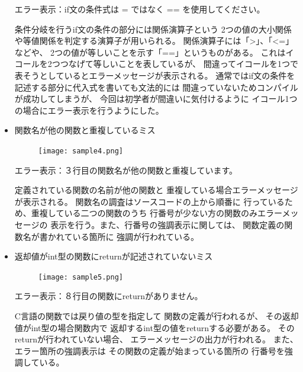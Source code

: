\documentclass{csspaper}
\begin{document}
\begin{itemize}
         エラー表示：if文の条件式は = ではなく == を使用してください。

         条件分岐を行うif文の条件の部分には関係演算子という
         2つの値の大小関係や等値関係を判定する演算子が用いられる。
         関係演算子には「\textgreater」、「\textless=」などや、
         2つの値が等しいことを示す「==」というものがある。
         これはイコールを2つつなげて等しいことを表しているが、
         間違ってイコールを1つで表そうとしているとエラーメッセージが表示される。
         通常ではif文の条件を記述する部分に代入式を書いても文法的には
         間違っていないためコンパイルが成功してしまうが、
         今回は初学者が間違いに気付けるように
         イコール1つの場合にエラー表示を行うようにした。

         \item 関数名が他の関数と重複しているミス
         
         \begin{figure}[h]
            \centering
            \texttt{[image: sample4.png]}
         \end{figure}

         エラー表示：３行目の関数名が他の関数と重複しています。

         定義されている関数の名前が他の関数と
         重複している場合エラーメッセージが表示される。
         関数名の調査はソースコードの上から順番に
         行っているため、重複している二つの関数のうち
         行番号が少ない方の関数のみエラーメッセージの
         表示を行う。また、行番号の強調表示に関しては、
         関数定義の関数名が書かれている箇所に
         強調が行われている。
         
         \item 返却値がint型の関数にreturnが記述されていないミス
         
         \begin{figure}[h]
            \centering
            \texttt{[image: sample5.png]}
         \end{figure}

         エラー表示：８行目の関数にreturnがありません。

         C言語の関数では戻り値の型を指定して
         関数の定義が行われるが、
         その返却値がint型の場合関数内で
         返却するint型の値をreturnする必要がある。
         そのreturnが行われていない場合、
         エラーメッセージの出力が行われる。
         また、エラー箇所の強調表示は
         その関数の定義が始まっている箇所の
         行番号を強調している。

      \end{itemize}
\end{document}
